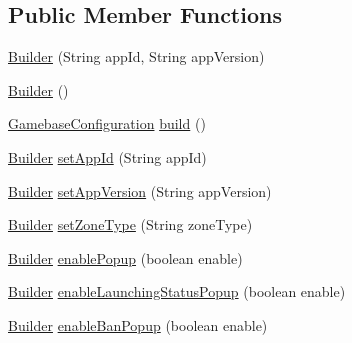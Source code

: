 \subsection*{Public Member Functions}
\begin{DoxyCompactItemize}
\item 
\hyperlink{classcom_1_1toast_1_1android_1_1gamebase_1_1_gamebase_configuration_1_1_builder_afbe6729f6423577d9a06c1832315f37d}{Builder} (String app\+Id, String app\+Version)
\item 
\hyperlink{classcom_1_1toast_1_1android_1_1gamebase_1_1_gamebase_configuration_1_1_builder_a4c5b1b5b658880619647b859000724fc}{Builder} ()
\item 
\hyperlink{classcom_1_1toast_1_1android_1_1gamebase_1_1_gamebase_configuration}{Gamebase\+Configuration} \hyperlink{classcom_1_1toast_1_1android_1_1gamebase_1_1_gamebase_configuration_1_1_builder_aa7918a81c9a0e2a68b4aeb901e5352b2}{build} ()
\item 
\hyperlink{classcom_1_1toast_1_1android_1_1gamebase_1_1_gamebase_configuration_1_1_builder}{Builder} \hyperlink{classcom_1_1toast_1_1android_1_1gamebase_1_1_gamebase_configuration_1_1_builder_a7a01a2201adac0aa638800cdd12da4cf}{set\+App\+Id} (String app\+Id)
\item 
\hyperlink{classcom_1_1toast_1_1android_1_1gamebase_1_1_gamebase_configuration_1_1_builder}{Builder} \hyperlink{classcom_1_1toast_1_1android_1_1gamebase_1_1_gamebase_configuration_1_1_builder_a9953399dac1f4293d3c480654929de32}{set\+App\+Version} (String app\+Version)
\item 
\hyperlink{classcom_1_1toast_1_1android_1_1gamebase_1_1_gamebase_configuration_1_1_builder}{Builder} \hyperlink{classcom_1_1toast_1_1android_1_1gamebase_1_1_gamebase_configuration_1_1_builder_a66db0aa4dc8c164fd7d93cd20e0af13e}{set\+Zone\+Type} (String zone\+Type)
\item 
\hyperlink{classcom_1_1toast_1_1android_1_1gamebase_1_1_gamebase_configuration_1_1_builder}{Builder} \hyperlink{classcom_1_1toast_1_1android_1_1gamebase_1_1_gamebase_configuration_1_1_builder_a5b53589024bfbfc126c7f621ee0c2722}{enable\+Popup} (boolean enable)
\item 
\hyperlink{classcom_1_1toast_1_1android_1_1gamebase_1_1_gamebase_configuration_1_1_builder}{Builder} \hyperlink{classcom_1_1toast_1_1android_1_1gamebase_1_1_gamebase_configuration_1_1_builder_a1012d5b14ba4676c15432cc45fd26488}{enable\+Launching\+Status\+Popup} (boolean enable)
\item 
\hyperlink{classcom_1_1toast_1_1android_1_1gamebase_1_1_gamebase_configuration_1_1_builder}{Builder} \hyperlink{classcom_1_1toast_1_1android_1_1gamebase_1_1_gamebase_configuration_1_1_builder_a92e099b86ad7acbabec3c0c4b7bda36e}{enable\+Ban\+Popup} (boolean enable)

\end{DoxyCompactItemize}

